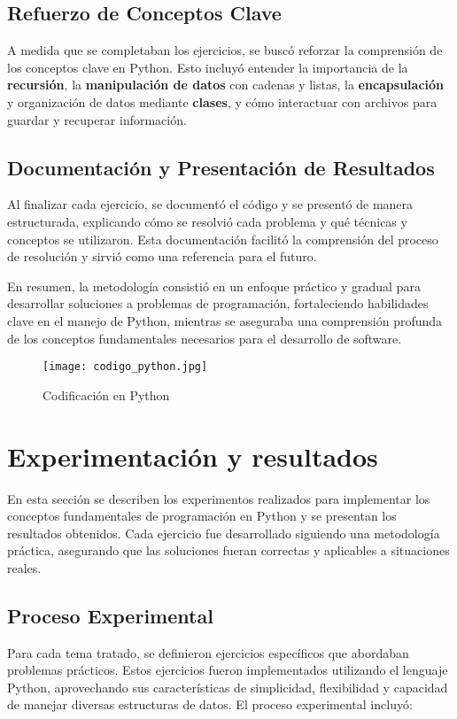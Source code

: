 \documentclass[conference]{IEEEtran}
\begin{document}
\subsection{Refuerzo de Conceptos Clave}
A medida que se completaban los ejercicios, se buscó reforzar la comprensión de los conceptos clave en Python. Esto incluyó entender la importancia de la \textbf{recursión}, la \textbf{manipulación de datos} con cadenas y listas, la \textbf{encapsulación} y organización de datos mediante \textbf{clases}, y cómo interactuar con archivos para guardar y recuperar información.

\subsection{Documentación y Presentación de Resultados}
Al finalizar cada ejercicio, se documentó el código y se presentó de manera estructurada, explicando cómo se resolvió cada problema y qué técnicas y conceptos se utilizaron. Esta documentación facilitó la comprensión del proceso de resolución y sirvió como una referencia para el futuro.

En resumen, la metodología consistió en un enfoque práctico y gradual para desarrollar soluciones a problemas de programación, fortaleciendo habilidades clave en el manejo de Python, mientras se aseguraba una comprensión profunda de los conceptos fundamentales necesarios para el desarrollo de software.

            \begin{figure}[h]
            \centering
            \texttt{[image: codigo\_python.jpg]}
            \caption{Codificación en Python} 
            \end{figure}

    
\section{Experimentación y resultados}

En esta sección se describen los experimentos realizados para implementar los conceptos fundamentales de programación en Python y se presentan los resultados obtenidos. Cada ejercicio fue desarrollado siguiendo una metodología práctica, asegurando que las soluciones fueran correctas y aplicables a situaciones reales.

\subsection{Proceso Experimental}
Para cada tema tratado, se definieron ejercicios específicos que abordaban problemas prácticos. Estos ejercicios fueron implementados utilizando el lenguaje Python, aprovechando sus características de simplicidad, flexibilidad y capacidad de manejar diversas estructuras de datos. El proceso experimental incluyó:
\end{document}
